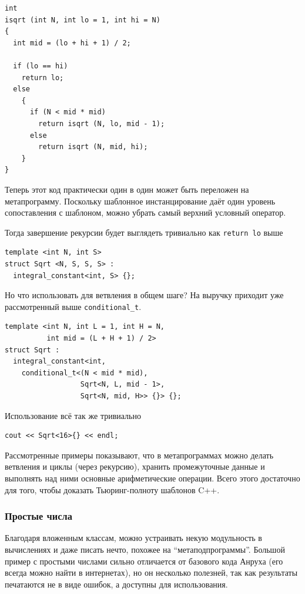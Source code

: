 \documentclass[a4paper,12pt,oneside]{article}
\begin{document}
\begin{lstlisting}
int
isqrt (int N, int lo = 1, int hi = N)
{
  int mid = (lo + hi + 1) / 2;

  if (lo == hi)
    return lo;
  else
    {
      if (N < mid * mid)
        return isqrt (N, lo, mid - 1);
      else
        return isqrt (N, mid, hi);
    }
}
\end{lstlisting}

Теперь этот код практически один в один может быть переложен на метапрограмму. Поскольку шаблонное инстанцирование даёт один уровень сопоставления с шаблоном, можно убрать самый верхний условный оператор.

Тогда завершение рекурсии будет выглядеть тривиально как \lstinline{return lo} выше

\begin{lstlisting}
template <int N, int S> 
struct Sqrt <N, S, S, S> :
  integral_constant<int, S> {};
\end{lstlisting}

Но что использовать для ветвления в общем шаге? На выручку приходит уже рассмотренный выше \lstinline!conditional_t!.

\begin{lstlisting}
template <int N, int L = 1, int H = N, 
          int mid = (L + H + 1) / 2> 
struct Sqrt :
  integral_constant<int, 
    conditional_t<(N < mid * mid), 
                  Sqrt<N, L, mid - 1>, 
                  Sqrt<N, mid, H>> {}> {};
\end{lstlisting}

Использование всё так же тривиально

\begin{lstlisting}
cout << Sqrt<16>{} << endl;
\end{lstlisting}

Рассмотренные примеры показывают, что в метапрограммах можно делать ветвления и циклы (через рекурсию), хранить промежуточные данные и выполнять над ними основные арифметические операции. Всего этого достаточно для того, чтобы доказать Тьюринг-полноту шаблонов C++.

\subsubsection{Простые числа}\label{TemplatePrimes}

Благодаря вложенным классам, можно устраивать некую модульность в вычислениях и даже писать нечто, похожее на ``метаподпрограммы''. Большой пример с простыми числами сильно отличается от базового кода Анруха (его всегда можно найти в интернетах), но он несколько полезней, так как результаты печатаются не в виде ошибок, а доступны для использования.
\end{document}
